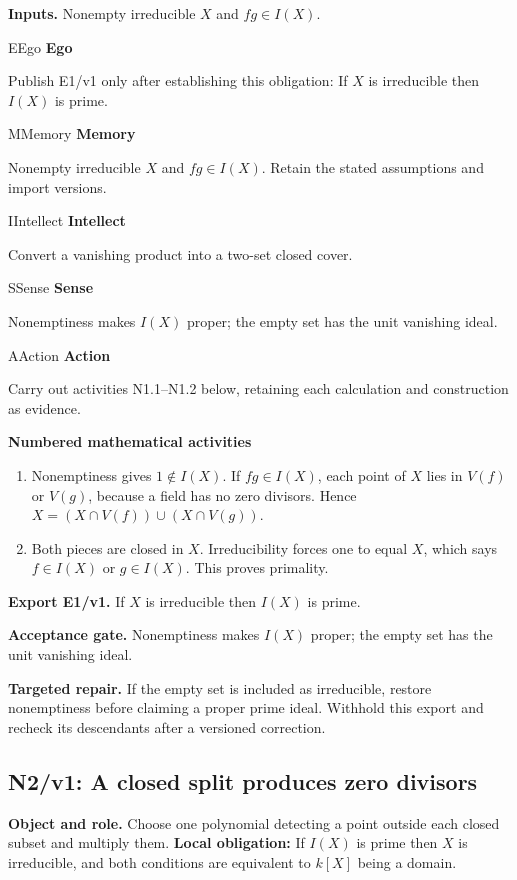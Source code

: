 \documentclass[preprint,12pt,aps,pra,showkeys,amsmath,amssymb,superscriptaddress,floatfix]{revtex4-2}
\theoremstyle{definition}
\theoremstyle{remark}
\newcommand{\mmfaculty}[3]{%
 \begin{mmfacultybox}{#1}{#2}
 {\sffamily\bfseries\color{MMBlue}#2}\par\smallskip #3
 \end{mmfacultybox}}
\newcommand{\field}[2]{\par\smallskip\noindent\textbf{#1.} #2\par}
\begin{document}
\field{Inputs}{Nonempty irreducible \(X\) and \(fg\in I(X)\).}

\mmfaculty{E}{Ego}{Publish E1/v1 only after establishing this obligation: If \(X\) is
irreducible then \(I(X)\) is prime.}

\mmfaculty{M}{Memory}{Nonempty irreducible \(X\) and \(fg\in I(X)\). Retain the stated
assumptions and import versions.}

\mmfaculty{I}{Intellect}{Convert a vanishing product into a two-set closed cover.}

\mmfaculty{S}{Sense}{Nonemptiness makes \(I(X)\) proper; the empty set has the unit vanishing
ideal.}

\mmfaculty{A}{Action}{Carry out activities N1.1--N1.2 below, retaining each calculation and
construction as evidence.}

\smallskip\noindent\textbf{Numbered mathematical activities}

\begin{enumerate}[label=N1.\arabic*,leftmargin=3.4em]

\item Nonemptiness gives \(1\notin I(X)\). If \(fg\in I(X)\), each point of
\(X\) lies in \(V(f)\) or \(V(g)\), because a field has no zero
divisors. Hence \(X=(X\cap V(f))\cup(X\cap V(g))\).

\item Both pieces are closed in \(X\). Irreducibility forces one to equal
\(X\), which says \(f\in I(X)\) or \(g\in I(X)\). This proves primality.

\end{enumerate}

\field{Export E1/v1}{If \(X\) is irreducible then \(I(X)\) is prime.}

\field{Acceptance gate}{Nonemptiness makes \(I(X)\) proper; the empty set has the unit vanishing
ideal.}

\field{Targeted repair}{If the empty set is included as irreducible, restore nonemptiness before
claiming a proper prime ideal. Withhold this export and recheck its
descendants after a versioned correction.}

\clearpage

\subsection{N2/v1: A closed split produces zero divisors}

\field{Object and role}{Choose one polynomial detecting a point outside each closed subset and
multiply them. \textbf{Local obligation:} If \(I(X)\) is prime then
\(X\) is irreducible, and both conditions are equivalent to \(k[X]\)
being a domain.}
\end{document}
